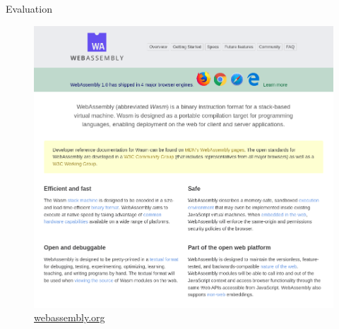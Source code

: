 \documentclass{beamer}
\begin{document}
\begin{frame}{Evaluation}
    \begin{figure}
        \includegraphics[scale=0.2]{./images/webassembly_org.png}
        \caption{\href{https://webassembly.org/}{webassembly.org}}
    \end{figure}
\end{frame}

\end{document}
